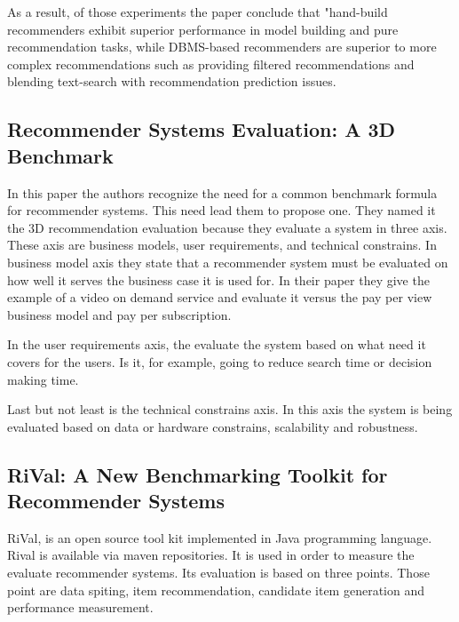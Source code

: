 As a result, of those experiments the paper conclude that "hand-build recommenders exhibit superior performance in model building and pure recommendation tasks, while DBMS-based recommenders are superior to more complex recommendations such as providing filtered recommendations and blending text-search with recommendation prediction issues.

\subsection{Recommender Systems Evaluation: A 3D Benchmark \cite{said2012recommender}}
In this paper the authors recognize the need for a common benchmark formula for recommender systems. This need lead them to propose one. They named it the 3D recommendation evaluation because they evaluate a system in three axis. These axis are business models, user requirements, and technical constrains. In business model axis they state that a recommender system must be evaluated on how well it serves the business case it is used for. In their paper they give the example of a video on demand service and evaluate it versus the pay per view business model and pay per subscription.

In the user requirements axis, the evaluate the system based on what need it covers for the users. Is it, for example, going to reduce search time or decision making time.

Last but not least is the technical constrains axis. In this axis the system is being evaluated based on data or hardware constrains, scalability and robustness.

\subsection{RiVal: A New Benchmarking Toolkit for Recommender Systems \cite{said2014rival}}
RiVal, is an open source tool kit implemented in Java programming language. Rival is available via maven repositories. It is used in order to measure the evaluate recommender systems. Its evaluation is based on three points. Those point are data spiting, item recommendation, candidate item generation and performance measurement. 